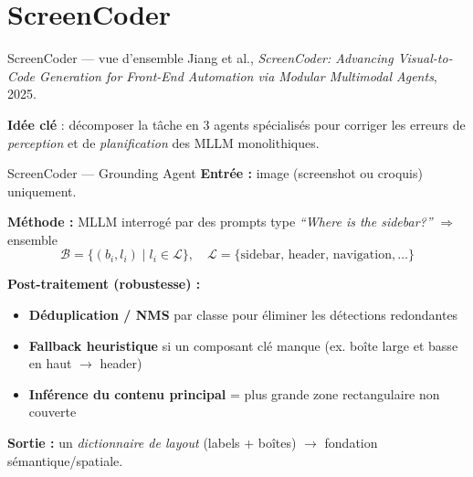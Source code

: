 \documentclass[10pt,aspectratio=169]{beamer}
\begin{document}
\section{ScreenCoder}
\begin{frame}{ScreenCoder --- vue d'ensemble}
\footnotesize Jiang et al., \emph{ScreenCoder: Advancing Visual-to-Code Generation for Front-End Automation via Modular Multimodal Agents}, 2025.

\vspace{2mm}
\textbf{Idée clé} : décomposer la tâche en 3 agents spécialisés pour corriger les erreurs de \emph{perception} et de \emph{planification} des MLLM monolithiques.

\begin{center}
\end{center}
\end{frame}

\begin{frame}{ScreenCoder --- Grounding Agent}
\textbf{Entrée :} image (screenshot ou croquis) uniquement.

\textbf{Méthode :} MLLM interrogé par des prompts type \emph{``Where is the sidebar?''} $\Rightarrow$ ensemble
$$\mathcal{B} = \{(b_i,l_i)\mid l_i \in \mathcal{L}\}, \quad \mathcal{L}=\{\text{sidebar, header, navigation}, \ldots\}$$

\textbf{Post-traitement (robustesse) :}
\begin{itemize}
  \item \textbf{Déduplication / NMS} par classe pour éliminer les détections redondantes
  \item \textbf{Fallback heuristique} si un composant clé manque (ex. boîte large et basse en haut $\to$ header)
  \item \textbf{Inférence du contenu principal} = plus grande zone rectangulaire non couverte
\end{itemize}

\textbf{Sortie :} un \emph{dictionnaire de layout} (labels + boîtes) $\to$ fondation sémantique/spatiale.
\end{frame}
\end{document}
